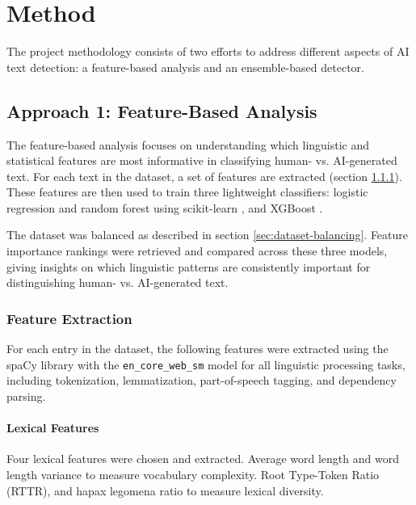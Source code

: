 \documentclass[11pt]{article}
\begin{document}
\section{Method}
\label{sec:method}

The project methodology consists of two efforts to address different aspects of AI text detection: a feature-based analysis and an ensemble-based detector.

\subsection{Approach 1: Feature-Based Analysis}
\label{sec:feature-based-analysis}
The feature-based analysis focuses on understanding which linguistic and statistical features are most informative in classifying human- vs. AI-generated text. For each text in the dataset, a set of features are extracted (section \ref{sec:feature-extraction}). These features are then used to train three lightweight classifiers: logistic regression and random forest using scikit-learn \citep{scikit-learn}, and XGBoost \citep{xgboost}.

The dataset was balanced as described in section \ref{sec:dataset-balancing}. Feature importance rankings were retrieved and compared across these three models, giving insights on which linguistic patterns are consistently important for distinguishing human- vs. AI-generated text.

\subsubsection{Feature Extraction}
\label{sec:feature-extraction}
For each entry in the dataset, the following features were extracted using the spaCy library \citep{spacy} with the \texttt{en\_core\_web\_sm} model for all linguistic processing tasks, including tokenization, lemmatization, part-of-speech tagging, and dependency parsing.

\paragraph{Lexical Features}
Four lexical features were chosen and extracted. Average word length and word length variance to measure vocabulary complexity. Root Type-Token Ratio (RTTR), and hapax legomena ratio to measure lexical diversity.
\end{document}
